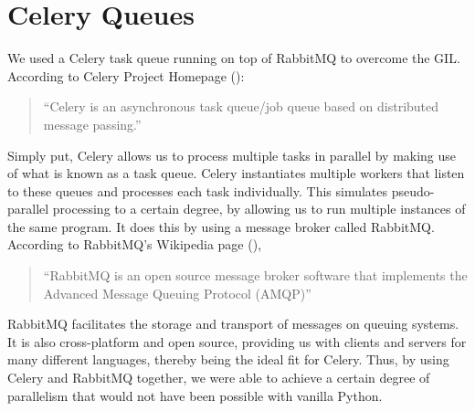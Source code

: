 \section{Celery Queues}
\label{exp:Celery}
We used a Celery task queue running on top of RabbitMQ to overcome the GIL. According to Celery Project Homepage (\cite{Celery}):
\begin{quotation}
``Celery is an asynchronous task queue/job queue based on distributed message passing.''
\end{quotation}

Simply put, Celery allows us to process multiple tasks in parallel by making use of what is known as a task queue. Celery instantiates multiple workers that listen to these queues and processes each task individually. This simulates pseudo-parallel processing to a certain degree, by allowing us to run multiple instances of the same program. It does this by using a message broker called RabbitMQ.
According to RabbitMQ's Wikipedia page (\cite{wiki:RabbitMQ}),
\begin{quotation}
``RabbitMQ is an open source message broker software that implements the Advanced Message Queuing Protocol (AMQP)''
\end{quotation}
RabbitMQ facilitates the storage and transport of messages on queuing systems. It is also cross-platform and open source, providing us with clients and servers for many different languages, thereby being the ideal fit for Celery.
Thus, by using Celery and RabbitMQ together, we were able to achieve a certain degree of parallelism that would not have been possible with vanilla Python.

